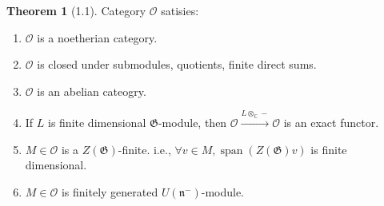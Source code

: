 \documentclass{article}
\theoremstyle{definition}
\newtheorem{theorem}{Theorem}
\begin{document}
    \begin{theorem}
        [1.1] Category \(\mathcal{O}\) satisies:

        \begin{enumerate}[label=\alph*)]
            \item \(\mathcal{O}\) is a noetherian category.
            \item \(\mathcal{O}\) is closed under submodules, quotients, finite direct sums.
            \item \(\mathcal{O}\) is an abelian cateogry.
            \item If \(L\) is finite dimensional \(\mathfrak{G}\)-module, then \(\mathcal{O} \xrightarrow{L \otimes_\mathbb{C} -}\mathcal{O}\) is an exact functor.
            \item \(M\in \mathcal{O}\) is a \(Z(\mathfrak{G})\)-finite. i.e., \(\forall v\in M, \operatorname{span}(Z(\mathfrak{G})v)\) is finite dimensional.
            \item \(M\in \mathcal{O}\) is finitely generated \(U(\mathfrak{n}^-)\)-module.  
        \end{enumerate} 
    \end{theorem}
\end{document}
